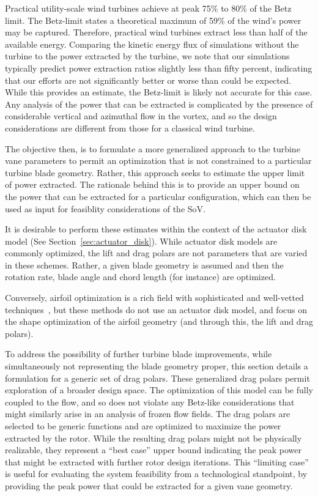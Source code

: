 Practical utility-scale wind turbines achieve at peak 75\% to 80\% of
the Betz limit\cite{burton2001wind}. The Betz-limit states a theoretical
maximum of 59\% of the wind's power may be captured. Therefore,
practical wind turbines extract less than half of the available energy. 
Comparing the
kinetic energy flux of simulations without the turbine to the power
extracted by the turbine, we note that our simulations typically predict
power extraction ratios slightly less than fifty percent, indicating
that our efforts are not significantly better or worse than could be
expected. While this provides an estimate, the Betz-limit is likely not
accurate for this case. Any analysis of the power that can be extracted
is complicated by the presence of considerable vertical and azimuthal
flow in the vortex, and so the design considerations are different from
those for a classical wind turbine. 

The objective then, is to formulate a more generalized approach to the
turbine vane parameters to permit an optimization that is not
constrained to a particular turbine blade geometry. Rather, this
approach seeks to estimate the upper limit of power extracted. The
rationale behind this is to provide an upper bound on the power that can 
be extracted for a particular configuration, which can then be used as
input for feasiblity considerations of the SoV.  

It is desirable to perform these estimates within the context of the
actuator disk model (See Section~\ref{sec:actuator_disk}). While
actuator disk models are commonly
optimized\cite{790585,WE:WE487,en5093425,adkins1983design}, the lift and
drag polars are not parameters that are varied in these schemes. Rather,
a given blade geometry is assumed and then the rotation rate, blade
angle and chord length (for instance) are optimized.   

Conversely, airfoil optimization is a rich field with sophisticated and
well-vetted
techniques~\cite{drela1998pros,lewis2001aerodynamic,Chehouri2015361}, 
but these methods do not use an actuator disk model, and focus on the
shape optimization of the airfoil geometry (and through this, the lift
and drag polars). 

To address the possibility of further turbine blade
improvements, while simultaneously not representing the blade geometry
proper, this section details a formulation for a generic set of drag
polars. These generalized drag polars permit exploration of a broader
design space. The optimization of this model can be fully coupled to the
flow, and so does not violate any Betz-like considerations that might
similarly arise in an analysis of frozen flow fields.
The drag polars are selected to be generic functions and are optimized to
maximize the power extracted by the rotor. While the resulting drag
polars might not be physically  realizable, they represent a ``best
case'' upper bound indicating the peak power that might be extracted
with further rotor design iterations. This ``limiting case'' is useful
for evaluating the system feasibility from a technological standpoint,
by providing the peak power that could be extracted for a given vane
geometry. 

